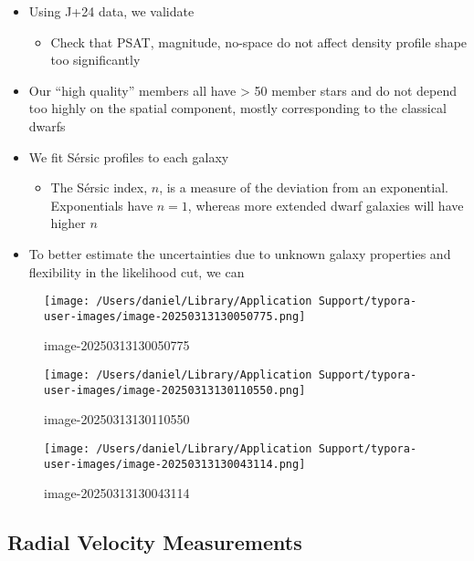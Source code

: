 \begin{itemize}
\tightlist
\item
  Using J+24 data, we validate

  \begin{itemize}
  \tightlist
  \item
    Check that PSAT, magnitude, no-space do not affect density profile
    shape too significantly
  \end{itemize}
\item
  Our ``high quality'' members all have \textgreater{} 50 member stars
  and do not depend too highly on the spatial component, mostly
  corresponding to the classical dwarfs
\item
  We fit Sérsic profiles to each galaxy

  \begin{itemize}
  \tightlist
  \item
    The Sérsic index, \(n\), is a measure of the deviation from an
    exponential. Exponentials have \(n=1\), whereas more extended dwarf
    galaxies will have higher \(n\)
  \end{itemize}
\item
  To better estimate the uncertainties due to unknown galaxy properties
  and flexibility in the likelihood cut, we can
\end{itemize}

\begin{figure}
\centering
\texttt{[image: /Users/daniel/Library/Application Support/typora-user-images/image-20250313130050775.png]}
\caption{image-20250313130050775}
\end{figure}

\begin{figure}
\centering
\texttt{[image: /Users/daniel/Library/Application Support/typora-user-images/image-20250313130110550.png]}
\caption{image-20250313130110550}
\end{figure}

\begin{figure}
\centering
\texttt{[image: /Users/daniel/Library/Application Support/typora-user-images/image-20250313130043114.png]}
\caption{image-20250313130043114}
\end{figure}

\subsection{Radial Velocity
Measurements}\label{radial-velocity-measurements}

